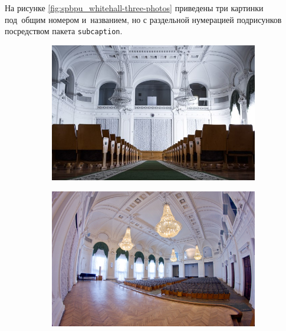 На рисунке \ref{fig:spbpu_whitehall-three-photos} приведены три картинки под~общим номером и~названием, но с раздельной нумерацией подрисунков посредством пакета \verb|subcaption|.

\begin{figure}[!htbp]
	\begin{subfigure}[t]{\dimexpr.3\linewidth-1.3em\relax}
		\centering
		\includegraphics[width=.95\linewidth,valign=t]{my_folder/images//spbpu_whitehall}
	\end{subfigure}
	\hfill %
	\begin{subfigure}[t]{\dimexpr.3\linewidth-1.3em\relax}
		\centering
		\includegraphics[width=.95\linewidth,valign=t]{my_folder/images//spbpu_whitehall_ligh}
	\end{subfigure}
	\hfill %

\end{figure}
